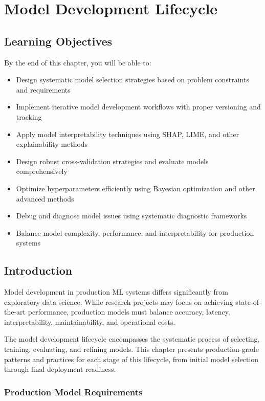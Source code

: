 \chapter{Model Development Lifecycle}
\label{ch:model_development}

\section*{Learning Objectives}

By the end of this chapter, you will be able to:

\begin{itemize}
    \item Design systematic model selection strategies based on problem constraints and requirements
    \item Implement iterative model development workflows with proper versioning and tracking
    \item Apply model interpretability techniques using SHAP, LIME, and other explainability methods
    \item Design robust cross-validation strategies and evaluate models comprehensively
    \item Optimize hyperparameters efficiently using Bayesian optimization and other advanced methods
    \item Debug and diagnose model issues using systematic diagnostic frameworks
    \item Balance model complexity, performance, and interpretability for production systems
\end{itemize}

\section{Introduction}

Model development in production ML systems differs significantly from exploratory data science. While research projects may focus on achieving state-of-the-art performance, production models must balance accuracy, latency, interpretability, maintainability, and operational costs.

The model development lifecycle encompasses the systematic process of selecting, training, evaluating, and refining models. This chapter presents production-grade patterns and practices for each stage of this lifecycle, from initial model selection through final deployment readiness.

\subsection{Production Model Requirements}

